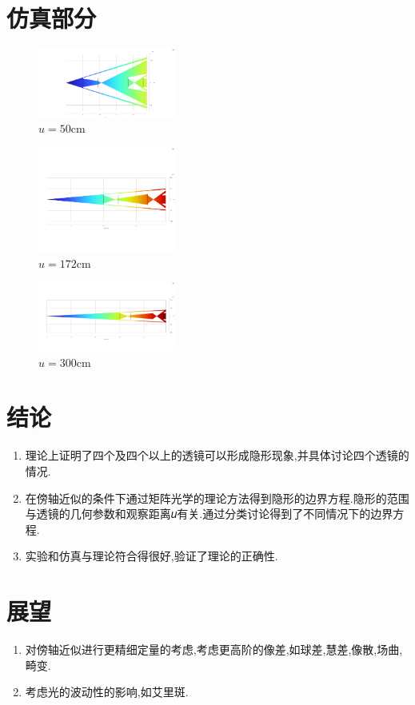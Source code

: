 \documentclass[UTF8]{gapd}
\begin{document}
\section{仿真部分}
\begin{figure}[htbp]
  \centering
  \includegraphics[width=0.4\textwidth]{images/27.png}
  \caption{$u=50\mathrm{cm} $}
\end{figure}
\begin{figure}[htbp]
  \centering
  \includegraphics[width=0.4\textwidth]{images/28.png}
  \caption{$u=172\mathrm{cm} $}
\end{figure}
\begin{figure}[htbp]
  \centering
  \includegraphics[width=0.4\textwidth]{images/29.png}
  \caption{$u=300\mathrm{cm} $}
\end{figure}
\section{结论}
\begin{enumerate}
  \item 理论上证明了四个及四个以上的透镜可以形成隐形现象,并具体讨论四个透镜的情况.
  \item 在傍轴近似的条件下通过矩阵光学的理论方法得到隐形的边界方程.隐形的范围与透镜的几何参数和观察距离𝑢有关.通过分类讨论得到了不同情况下的边界方程.
  \item 实验和仿真与理论符合得很好,验证了理论的正确性.
\end{enumerate}
\section{展望}
\begin{enumerate}
  \item 对傍轴近似进行更精细定量的考虑,考虑更高阶的像差,如球差,慧差,像散,场曲,畸变.
  \item 考虑光的波动性的影响,如艾里斑.
\end{enumerate}
\end{document}
